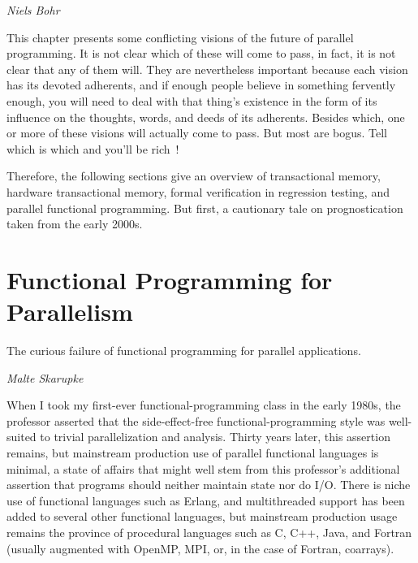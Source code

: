 
%
	 {\emph{Niels Bohr}}

This chapter presents some conflicting visions of the future of parallel
programming.
It is not clear which of these will come to pass, in fact, it is not
clear that any of them will.
They are nevertheless important because each vision has its devoted
adherents, and if enough people believe in something fervently enough,
you will need to deal with that thing's existence in the form of its
influence on the thoughts, words, and deeds of its adherents.
Besides which, one or more of these visions will actually come to pass.
But most are bogus.
Tell which is which and you'll be rich~\cite{KeithRSpitz1977}!

Therefore, the following sections give an overview of transactional
memory, hardware transactional memory,
formal verification in regression testing, and
parallel functional programming.
But first, a cautionary tale on prognostication taken from the early 2000s.






\section{Functional Programming for Parallelism}
\label{sec:future:Functional Programming for Parallelism}
%
\epigraph{The curious failure of functional programming for parallel
	  applications.}
	 {\emph{Malte Skarupke}}

When I took my first-ever functional-programming class in the early 1980s,
the professor asserted that the side-effect-free functional-programming
style was well-suited to trivial parallelization and analysis.
Thirty years later, this assertion remains, but mainstream production
use of parallel functional languages is minimal, a state of affairs
that might well stem from this professor's additional assertion that
programs should neither maintain state nor do I/O.
There is niche use of functional languages such as Erlang, and
multithreaded support has been added to several other functional languages,
but mainstream production usage remains the province of procedural
languages such as C, C++, Java, and Fortran (usually augmented with
OpenMP, MPI, or, in the case of Fortran, coarrays).

